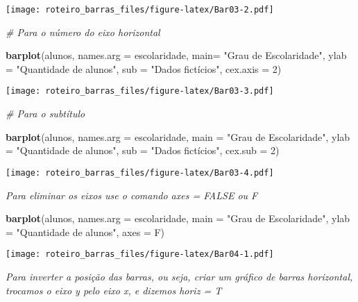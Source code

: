 \documentclass[]{article}
\newenvironment{Shaded}{\begin{snugshade}}{\end{snugshade}}
\newcommand{\CommentTok}[1]{\textcolor[rgb]{0.56,0.35,0.01}{\textit{#1}}}
\newcommand{\DataTypeTok}[1]{\textcolor[rgb]{0.13,0.29,0.53}{#1}}
\newcommand{\DecValTok}[1]{\textcolor[rgb]{0.00,0.00,0.81}{#1}}
\newcommand{\KeywordTok}[1]{\textcolor[rgb]{0.13,0.29,0.53}{\textbf{#1}}}
\newcommand{\NormalTok}[1]{#1}
\newcommand{\StringTok}[1]{\textcolor[rgb]{0.31,0.60,0.02}{#1}}
\begin{document}
\texttt{[image: roteiro\_barras\_files/figure-latex/Bar03-2.pdf]}

\begin{Shaded}
\begin{Highlighting}[]
\CommentTok{# Para o número do eixo horizontal}

\KeywordTok{barplot}\NormalTok{(alunos, }\DataTypeTok{names.arg =}\NormalTok{ escolaridade, }\DataTypeTok{main=} \StringTok{"Grau de Escolaridade"}\NormalTok{, }
        \DataTypeTok{ylab =} \StringTok{"Quantidade de alunos"}\NormalTok{, }\DataTypeTok{sub =} \StringTok{"Dados fictícios"}\NormalTok{, }\DataTypeTok{cex.axis =} \DecValTok{2}\NormalTok{)}
\end{Highlighting}
\end{Shaded}

\texttt{[image: roteiro\_barras\_files/figure-latex/Bar03-3.pdf]}

\begin{Shaded}
\begin{Highlighting}[]
\CommentTok{# Para o subtítulo}

\KeywordTok{barplot}\NormalTok{(alunos, }\DataTypeTok{names.arg =}\NormalTok{ escolaridade, }\DataTypeTok{main =} \StringTok{"Grau de Escolaridade"}\NormalTok{, }
        \DataTypeTok{ylab =} \StringTok{"Quantidade de alunos"}\NormalTok{, }\DataTypeTok{sub =} \StringTok{"Dados fictícios"}\NormalTok{, }\DataTypeTok{cex.sub =} \DecValTok{2}\NormalTok{)}
\end{Highlighting}
\end{Shaded}

\texttt{[image: roteiro\_barras\_files/figure-latex/Bar03-4.pdf]}

\emph{Para eliminar os eixos use o comando axes = FALSE ou F}

\begin{Shaded}
\begin{Highlighting}[]
\KeywordTok{barplot}\NormalTok{(alunos, }\DataTypeTok{names.arg =}\NormalTok{ escolaridade, }\DataTypeTok{main =} \StringTok{"Grau de Escolaridade"}\NormalTok{, }
        \DataTypeTok{ylab =} \StringTok{"Quantidade de alunos"}\NormalTok{, }\DataTypeTok{axes =}\NormalTok{ F)}
\end{Highlighting}
\end{Shaded}

\texttt{[image: roteiro\_barras\_files/figure-latex/Bar04-1.pdf]}

\emph{Para inverter a posição das barras, ou seja, criar um gráfico de
barras horizontal, trocamos o eixo y pelo eixo x, e dizemos horiz = T}
\end{document}
